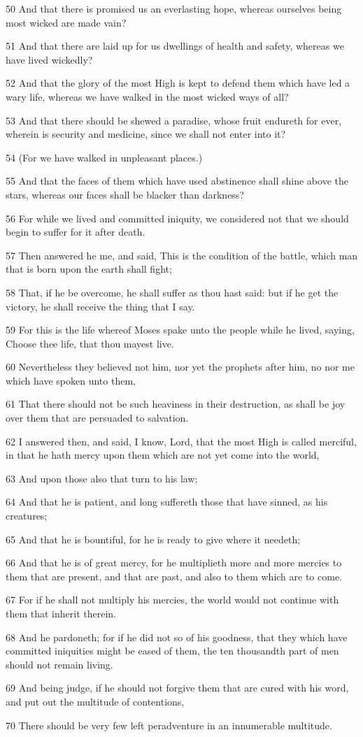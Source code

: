\par 50 And that there is promised us an everlasting hope, whereas ourselves being most wicked are made vain?
\par 51 And that there are laid up for us dwellings of health and safety, whereas we have lived wickedly?
\par 52 And that the glory of the most High is kept to defend them which have led a wary life, whereas we have walked in the most wicked ways of all?
\par 53 And that there should be shewed a paradise, whose fruit endureth for ever, wherein is security and medicine, since we shall not enter into it?
\par 54 (For we have walked in unpleasant places.)
\par 55 And that the faces of them which have used abstinence shall shine above the stars, whereas our faces shall be blacker than darkness?
\par 56 For while we lived and committed iniquity, we considered not that we should begin to suffer for it after death.
\par 57 Then answered he me, and said, This is the condition of the battle, which man that is born upon the earth shall fight;
\par 58 That, if he be overcome, he shall suffer as thou hast said: but if he get the victory, he shall receive the thing that I say.
\par 59 For this is the life whereof Moses spake unto the people while he lived, saying, Choose thee life, that thou mayest live.
\par 60 Nevertheless they believed not him, nor yet the prophets after him, no nor me which have spoken unto them,
\par 61 That there should not be such heaviness in their destruction, as shall be joy over them that are persuaded to salvation.
\par 62 I answered then, and said, I know, Lord, that the most High is called merciful, in that he hath mercy upon them which are not yet come into the world,
\par 63 And upon those also that turn to his law;
\par 64 And that he is patient, and long suffereth those that have sinned, as his creatures;
\par 65 And that he is bountiful, for he is ready to give where it needeth;
\par 66 And that he is of great mercy, for he multiplieth more and more mercies to them that are present, and that are past, and also to them which are to come.
\par 67 For if he shall not multiply his mercies, the world would not continue with them that inherit therein.
\par 68 And he pardoneth; for if he did not so of his goodness, that they which have committed iniquities might be eased of them, the ten thousandth part of men should not remain living.
\par 69 And being judge, if he should not forgive them that are cured with his word, and put out the multitude of contentions,
\par 70 There should be very few left peradventure in an innumerable multitude.

